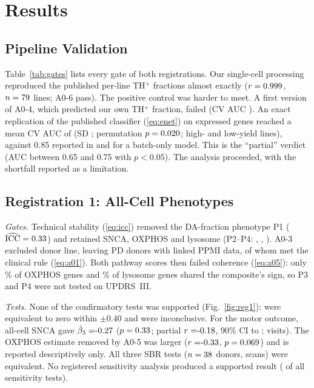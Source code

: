 
\section{Results}\label{sec:results}

\subsection{Pipeline Validation}\label{sec:res_pipeline}
Table~\ref{tab:gates} lists every gate of both registrations. Our single-cell processing
reproduced the published per-line TH$^+$ fractions almost exactly ($r = 0.999$,
$n = 79$ lines; A0-6 pass). The positive control was harder to meet. A first version of
A0-4, which predicted our own TH$^+$ fraction, failed (CV AUC \cconeAucv). An exact replication of
the published classifier (\ref{eq:enet}) on \cconeDayZeroGenes{} expressed genes reached a mean CV
AUC of \cconeAuc{} (SD \cconeAucSD; permutation $p = 0.020$; \cconeHigh{} high- and
\cconeLow{} low-yield lines), against 0.85 reported in \cite{bressan2023foundin} and
\cconeAucBatch{} for a batch-only model. This is the ``partial'' verdict (AUC between 0.65 and
0.75 with $p < 0.05$). The analysis proceeded, with the shortfall reported as a limitation.



\subsection{Registration 1: All-Cell Phenotypes}\label{sec:res_reg1}
\emph{Gates.} Technical stability (\ref{eq:icc}) removed the DA-fraction phenotype P1
($\widehat{\mathrm{ICC}} = 0.33$) and retained SNCA, OXPHOS and lysosome (P2--P4:
\cconeIccPtwo, \cconeIccPthree, \cconeIccPfour). A0-3 excluded \cconeAthreeExcl{} donor line,
leaving \cconeN{} PD donors with linked PPMI data, of whom \cconeAzeroOne{} met the clinical rule
(\ref{eq:a01}). Both pathway scores then failed coherence (\ref{eq:a05}): only
\cconeAfivePthree\% of \cconeAfivePthreeN{} OXPHOS genes and \cconeAfivePfour\% of
\cconeAfivePfourN{} lysosome genes shared the composite's sign, so P3 and P4 were not tested on
UPDRS~III.

\emph{Tests.} None of the \cconeNtests{} confirmatory tests was supported
(Fig.~\ref{fig:reg1}): \cconeNeq{} were equivalent to zero within $\pm 0.40$ and \cconeNinc{} were
inconclusive. For the motor outcome, all-cell SNCA gave $\hat\beta_3 = \cconeHoneBeta$
($p = 0.33$; partial $r = \cconeHoneR$, 90\% CI \cconeHoneRlo{} to \cconeHoneRhi;
\cconeVisits{} visits). The OXPHOS estimate removed by A0-5 was larger ($r = \cconeHthreeR$,
$p = 0.069$) and is reported descriptively only. All three SBR tests
($n = 38$ donors, \cconeSBRobs{} scans) were equivalent. No registered sensitivity analysis
produced a supported result (\cconeSensSup{} of all sensitivity tests).

